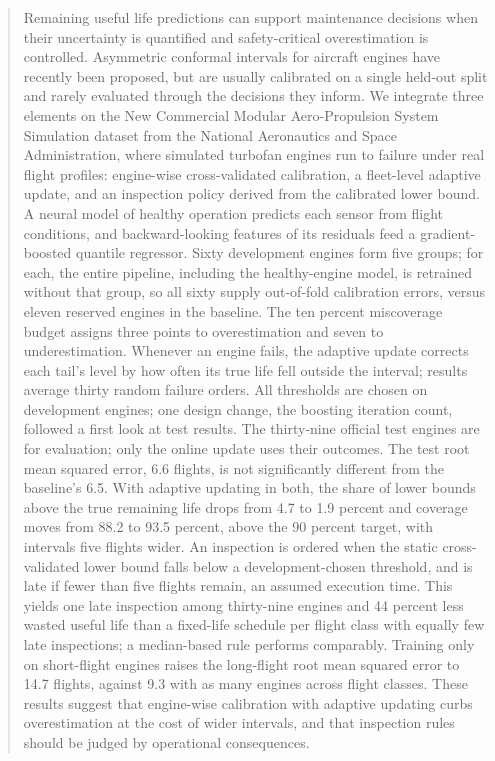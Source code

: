 \documentclass[PHM]{PHMSociety}
\begin{document}
\begin{abstract}
Remaining useful life predictions can support maintenance decisions when their uncertainty is quantified and safety-critical overestimation is controlled. Asymmetric conformal intervals for aircraft engines have recently been proposed, but are usually calibrated on a single held-out split and rarely evaluated through the decisions they inform. We integrate three elements on the New Commercial Modular Aero-Propulsion System Simulation dataset from the National Aeronautics and Space Administration, where simulated turbofan engines run to failure under real flight profiles: engine-wise cross-validated calibration, a fleet-level adaptive update, and an inspection policy derived from the calibrated lower bound. A neural model of healthy operation predicts each sensor from flight conditions, and backward-looking features of its residuals feed a gradient-boosted quantile regressor. Sixty development engines form five groups; for each, the entire pipeline, including the healthy-engine model, is retrained without that group, so all sixty supply out-of-fold calibration errors, versus eleven reserved engines in the baseline. The ten percent miscoverage budget assigns three points to overestimation and seven to underestimation. Whenever an engine fails, the adaptive update corrects each tail's level by how often its true life fell outside the interval; results average thirty random failure orders. All thresholds are chosen on development engines; one design change, the boosting iteration count, followed a first look at test results. The thirty-nine official test engines are for evaluation; only the online update uses their outcomes. The test root mean squared error, 6.6 flights, is not significantly different from the baseline's 6.5. With adaptive updating in both, the share of lower bounds above the true remaining life drops from 4.7 to 1.9 percent and coverage moves from 88.2 to 93.5 percent, above the 90 percent target, with intervals five flights wider. An inspection is ordered when the static cross-validated lower bound falls below a development-chosen threshold, and is late if fewer than five flights remain, an assumed execution time. This yields one late inspection among thirty-nine engines and 44 percent less wasted useful life than a fixed-life schedule per flight class with equally few late inspections; a median-based rule performs comparably. Training only on short-flight engines raises the long-flight root mean squared error to 14.7 flights, against 9.3 with as many engines across flight classes. These results suggest that engine-wise calibration with adaptive updating curbs overestimation at the cost of wider intervals, and that inspection rules should be judged by operational consequences.
\end{abstract}
\end{document}
